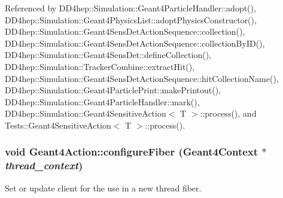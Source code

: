 Referenced by DD4hep::Simulation::Geant4ParticleHandler::adopt(), DD4hep::Simulation::Geant4PhysicsList::adoptPhysicsConstructor(), DD4hep::Simulation::Geant4SensDetActionSequence::collection(), DD4hep::Simulation::Geant4SensDetActionSequence::collectionByID(), DD4hep::Simulation::Geant4SensDet::defineCollection(), DD4hep::Simulation::TrackerCombine::extractHit(), DD4hep::Simulation::Geant4SensDetActionSequence::hitCollectionName(), DD4hep::Simulation::Geant4ParticlePrint::makePrintout(), DD4hep::Simulation::Geant4ParticleHandler::mark(), DD4hep::Simulation::Geant4SensitiveAction$<$ T $>$::process(), and Tests::Geant4SensitiveAction$<$ T $>$::process().\hypertarget{class_d_d4hep_1_1_simulation_1_1_geant4_action_a6adc7138508303e4e417cb48a737ab19}{
\subsubsection[{configureFiber}]{\setlength{\rightskip}{0pt plus 5cm}void Geant4Action::configureFiber ({\bf Geant4Context} $\ast$ {\em thread\_\-context})}}
\label{class_d_d4hep_1_1_simulation_1_1_geant4_action_a6adc7138508303e4e417cb48a737ab19}


Set or update client for the use in a new thread fiber. 

